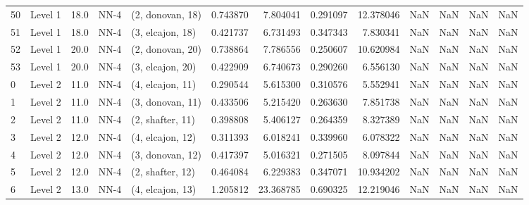 \begin{tabular}{llrllrrrrrrrr}
50 &   Level 1 &   18.0 &        NN-4 &  (2, donovan, 18) &   0.743870 &   7.804041 &  0.291097 &  12.378046 &                  NaN &                    NaN &                 NaN &                   NaN \\
51 &   Level 1 &   18.0 &        NN-4 &  (3, elcajon, 18) &   0.421737 &   6.731493 &  0.347343 &   7.830341 &                  NaN &                    NaN &                 NaN &                   NaN \\
52 &   Level 1 &   20.0 &        NN-4 &  (2, donovan, 20) &   0.738864 &   7.786556 &  0.250607 &  10.620984 &                  NaN &                    NaN &                 NaN &                   NaN \\
53 &   Level 1 &   20.0 &        NN-4 &  (3, elcajon, 20) &   0.422909 &   6.740673 &  0.290260 &   6.556130 &                  NaN &                    NaN &                 NaN &                   NaN \\
0  &   Level 2 &   11.0 &        NN-4 &  (4, elcajon, 11) &   0.290544 &   5.615300 &  0.310576 &   5.552941 &                  NaN &                    NaN &                 NaN &                   NaN \\
1  &   Level 2 &   11.0 &        NN-4 &  (3, donovan, 11) &   0.433506 &   5.215420 &  0.263630 &   7.851738 &                  NaN &                    NaN &                 NaN &                   NaN \\
2  &   Level 2 &   11.0 &        NN-4 &  (2, shafter, 11) &   0.398808 &   5.406127 &  0.264359 &   8.327389 &                  NaN &                    NaN &                 NaN &                   NaN \\
3  &   Level 2 &   12.0 &        NN-4 &  (4, elcajon, 12) &   0.311393 &   6.018241 &  0.339960 &   6.078322 &                  NaN &                    NaN &                 NaN &                   NaN \\
4  &   Level 2 &   12.0 &        NN-4 &  (3, donovan, 12) &   0.417397 &   5.016321 &  0.271505 &   8.097844 &                  NaN &                    NaN &                 NaN &                   NaN \\
5  &   Level 2 &   12.0 &        NN-4 &  (2, shafter, 12) &   0.464084 &   6.229383 &  0.347071 &  10.934202 &                  NaN &                    NaN &                 NaN &                   NaN \\
6  &   Level 2 &   13.0 &        NN-4 &  (4, elcajon, 13) &   1.205812 &  23.368785 &  0.690325 &  12.219046 &                  NaN &                    NaN &                 NaN &                   NaN \\

\end{tabular}

